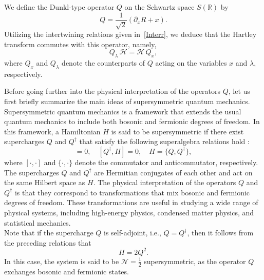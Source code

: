\documentclass[12 pt]{amsart}
\numberwithin{equation}{section}
\begin{document}
We define the Dunkl-type operator \( Q \) on the Schwartz space \( S(\mathbb{R}) \) by
\begin{equation}\label{supercharge}
Q = \frac{1}{\sqrt{2}} \left( \partial_x R + x \right).
\end{equation}
Utilizing the intertwining relations given in~\eqref{Interr}, we deduce that the Hartley transform commutes with this operator, namely,
\begin{equation}
Q_\lambda \, \mathscr{H} = \mathscr{H} \, Q_x,
\end{equation}
where \( Q_x \) and \( Q_\lambda \) denote the counterparts of \( Q \) acting on the variables \( x \) and \( \lambda \), respectively.

Before going further into the physical interpretation of the operators $Q$, let us first briefly summarize the main ideas of supersymmetric quantum mechanics.
Supersymmetric quantum mechanics is a framework that extends the usual quantum mechanics to include both bosonic and fermionic degrees of freedom. In this framework, a Hamiltonian $H$ is said to be supersymmetric if there exist supercharges $Q$ and $Q^\dagger$ that satisfy the following superalgebra relations hold \cite{Karr}:
\begin{equation}
[Q,H]=0,\quad [Q^\dagger,H]=0,\quad H=\{Q,Q^\dagger\},
\label{Susy}
\end{equation}
where $[\cdot,\cdot]$ and $\{\cdot,\cdot\}$ denote the commutator and anticommutator, respectively. The supercharges $Q$ and $Q^\dagger$ are Hermitian conjugates of each other and act on the same Hilbert space as $H$.
The physical interpretation of the operators $Q$ and $Q^\dagger$ is that they correspond to transformations that mix bosonic and fermionic degrees of freedom. These transformations are useful in studying a wide range of physical systems, including high-energy physics, condensed matter physics, and statistical mechanics.\\
Note that if the supercharge \( Q \) is self-adjoint, i.e., \( Q = Q^\dagger \), then it follows from the preceding relations that
\[
H = 2 Q^2.
\]
In this case, the system is said to be \( \mathcal{N} = \tfrac{1}{2} \) supersymmetric, as the operator \( Q \) exchanges bosonic and fermionic states.
\end{document}
